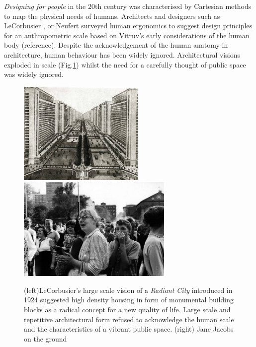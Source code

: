 \textit{Designing for people} \cite{Dreyfuss_1955} in the 20th century was characterised by Cartesian methods to map the physical needs of humans. Architects and designers such as LeCorbusier \cite{Lecorbusier_xxxx}, or Neufert \cite{Neufert_1955} surveyed human ergonomics to suggest design principles for an anthropometric scale based on Vitruv's early considerations of the human body (reference). Despite the acknowledgement of the human anatomy in architecture, human behaviour has been widely ignored. Architectural visions exploded in scale (Fig.\ref{RadiantCity}) whilst the need for a carefully thought of public space was widely ignored.


\begin{figure}[h] 
\centering
\includegraphics[height=5cm]{Illustrations/ville_radieuse.jpg}
\includegraphics[height=5cm]{Illustrations/Jacobs.jpg}
\caption [The Radiant City, LeCorbusier (1924)] {(left)LeCorbusier's large scale vision of a \textit{Radiant City} \cite{Lecorbusier_1930}  introduced in 1924 suggested high density housing in form of monumental building blocks as a radical concept for a new quality of life. Large scale and repetitive architectural form refused to acknowledge the human scale and the characteristics of a vibrant public space. (right) Jane Jacobs on the ground}
\label{RadiantCity}
\end{figure}


